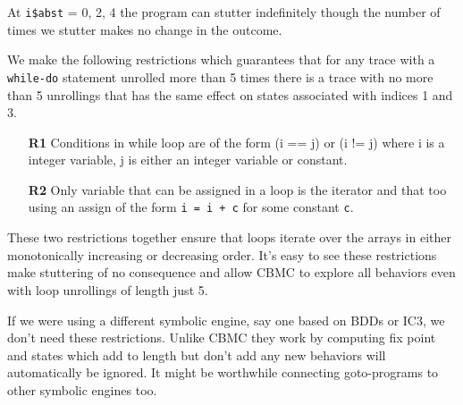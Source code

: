At {\tt i\$abst} = 0, 2, 4 the program can stutter indefinitely though
the number of times we stutter makes no change in the outcome.

We make the following restrictions which guarantees that for any trace
with a {\tt while-do} statement unrolled more than 5 times there is a
trace with no more than 5 unrollings that has the same effect on
states associated with indices 1 and 3.

\begin{itemize}
\item[{\bf R1}] Conditions in while loop are of the form (i == j) or (i != j) where
i is a integer variable, j is either an integer variable or constant.
\item[{\bf R2}] Only variable that can be assigned in a loop is the iterator
  and that too using an assign of the form {\tt i = i + c} for some
  constant {\tt c}.
\end{itemize}

These two restrictions together ensure that loops iterate over the
arrays in either monotonically increasing or decreasing order. It’s
easy to see these restrictions make stuttering of no consequence and
allow CBMC to explore all behaviors even with loop unrollings of
length just 5.

\begin{remark}
If we were using a different symbolic engine, say one based on
BDDs or IC3, we don’t need these restrictions. Unlike CBMC
they work by computing fix point and states which add to length but
don’t add any new behaviors will automatically be ignored.  It might
be worthwhile connecting goto-programs to other symbolic engines too.
\end{remark}

